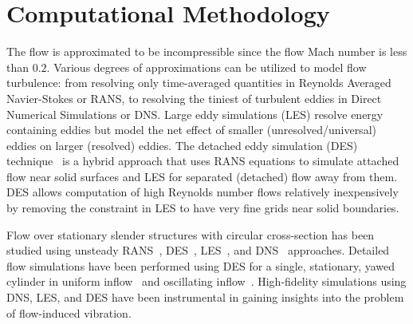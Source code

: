 \section{Computational Methodology}
\label{sec:methodology}
%
The flow is approximated to be incompressible since the flow Mach number is
less than $0.2$. Various degrees of approximations can be utilized to model
flow turbulence: from resolving only time-averaged quantities in Reynolds
Averaged Navier-Stokes or RANS, to resolving the tiniest of turbulent eddies in
Direct Numerical Simulations or DNS. Large eddy simulations (LES) resolve
energy containing eddies but model the net effect of smaller
(unresolved/universal) eddies on larger (resolved) eddies. The detached eddy
simulation (DES) technique~\citep{spalart1997comments} is a hybrid approach
that uses RANS equations to simulate attached flow near solid surfaces and LES
for separated (detached) flow away from them. DES allows computation of high
Reynolds number flows relatively inexpensively by removing the constraint in
LES to have very fine grids near solid boundaries.

Flow over stationary slender structures with circular cross-section has been
studied using unsteady RANS~\citep{pontaza2009three},
DES~\citep{travin2000detached,yeo2011computational,yeo2012aerodynamic},
LES~\citep{breuer1998large,kravchenko2000numerical,catalano2003numerical}, and
DNS~\citep{dong2005dns,zhao2009direct} approaches. Detailed flow simulations
have been performed using DES for a single, stationary, yawed cylinder in
uniform inflow~\citep{yeo2008investigation} and oscillating
inflow~\citep{yeo2012aerodynamic}. 
High-fidelity simulations using DNS, LES, and DES have been instrumental in
gaining insights into the problem of flow-induced vibration.

